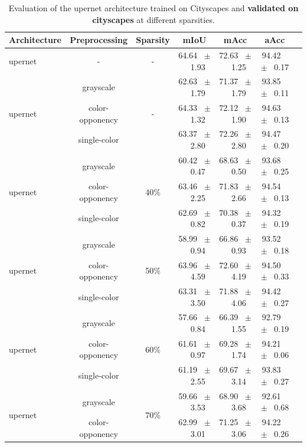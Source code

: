 \begin{table}[h]
  \centering
  \caption{Evaluation of the upernet architecture trained on Cityscapes and \textbf{validated on cityscapes} at different sparsities.}
  \begin{tabular}{@{}lccc ccc@{}}
    \toprule
    Architecture & Preprocessing & Sparsity & mIoU & mAcc & aAcc \\
    \midrule
    upernet & - & - & 64.64 ~$\pm$~ 1.93 & 72.63 ~$\pm$~ 1.25 & 94.42 ~$\pm$~ 0.17 \\
    \midrule
    \midrule
    \multirow{3}{*}{upernet} & grayscale & \multirow{3}{*}{-} & 62.63 ~$\pm$~ 1.79 & 71.37 ~$\pm$~ 1.79 & 93.85 ~$\pm$~ 0.11 \\
    & color-opponency & & 64.33 ~$\pm$~ 1.32 & 72.12 ~$\pm$~ 1.90 & 94.63 ~$\pm$~ 0.13 \\
    & single-color & & 63.37 ~$\pm$~ 2.80 & 72.26 ~$\pm$~ 2.80 & 94.47 ~$\pm$~ 0.20 \\
    \midrule
    \multirow{3}{*}{upernet} & grayscale & \multirow{3}{*}{40\%} & 60.42 ~$\pm$~ 0.47 & 68.63 ~$\pm$~ 0.50 & 93.68 ~$\pm$~ 0.25 \\
    & color-opponency & & 63.46 ~$\pm$~ 2.25 & 71.83 ~$\pm$~ 2.66 & 94.54 ~$\pm$~ 0.13 \\
    & single-color & & 62.69 ~$\pm$~ 0.82 & 70.38 ~$\pm$~ 0.37 & 94.32 ~$\pm$~ 0.19 \\
    \midrule
    \multirow{3}{*}{upernet} & grayscale & \multirow{3}{*}{50\%} & 58.99 ~$\pm$~ 0.94 & 66.86 ~$\pm$~ 0.93 & 93.52 ~$\pm$~ 0.18 \\
    & color-opponency & & 63.96 ~$\pm$~ 4.59 & 72.60 ~$\pm$~ 4.19 & 94.50 ~$\pm$~ 0.33 \\
    & single-color & & 63.31 ~$\pm$~ 3.50 & 71.88 ~$\pm$~ 4.06 & 94.42 ~$\pm$~ 0.27 \\
    \midrule
    \multirow{3}{*}{upernet} & grayscale & \multirow{3}{*}{60\%} & 57.66 ~$\pm$~ 0.84 & 66.39 ~$\pm$~ 1.55 & 92.79 ~$\pm$~ 0.19 \\
    & color-opponency & & 61.61 ~$\pm$~ 0.97 & 69.28 ~$\pm$~ 1.74 & 94.21 ~$\pm$~ 0.06 \\
    & single-color & & 61.19 ~$\pm$~ 2.55 & 69.67 ~$\pm$~ 3.14 & 93.83 ~$\pm$~ 0.27 \\
    \midrule
    \multirow{3}{*}{upernet} & grayscale & \multirow{3}{*}{70\%} & 59.66 ~$\pm$~ 3.53 & 68.90 ~$\pm$~ 3.68 & 92.61 ~$\pm$~ 0.68 \\
    & color-opponency & & 62.99 ~$\pm$~ 3.01 & 71.25 ~$\pm$~ 3.06 & 94.22 ~$\pm$~ 0.26 \\

\end{tabular}
\end{table}
